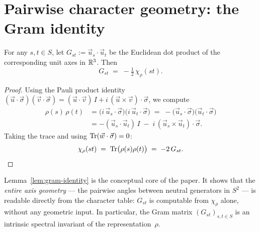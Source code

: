 \section{Pairwise character geometry: the Gram identity}
  \label{sec:gram}

  \begin{lemma}
    \label{lem:gram-identity}
    For any $s, t \in S$, let $G_{st} := \vec{u}_s \cdot \vec{u}_t$ be the Euclidean
    dot product of the corresponding unit axes in $\mathbb{R}^3$.
    Then
    \begin{equation}
      G_{st} \;=\; -\tfrac{1}{2}\,\chi_\rho(st).
      \label{eq:gram-identity}
    \end{equation}
  \end{lemma}

  \begin{proof}
    Using the Pauli product identity
    $({\vec{u}} \cdot \vec{\sigma})({\vec{v}} \cdot \vec{\sigma})
    = (\vec{u} \cdot \vec{v})\,I + i\,(\vec{u} \times \vec{v}) \cdot \vec{\sigma}$,
    we compute
    \begin{align*}
      \rho(s)\,\rho(t)
      &= \bigl(i\,\vec{u}_s \cdot \vec{\sigma}\bigr)
      \bigl(i\,\vec{u}_t \cdot \vec{\sigma}\bigr)
      \;=\; -\bigl(\vec{u}_s \cdot \vec{\sigma}\bigr)
      \bigl(\vec{u}_t \cdot \vec{\sigma}\bigr) \\
      &= -(\vec{u}_s \cdot \vec{u}_t)\,I
      \;-\; i\,(\vec{u}_s \times \vec{u}_t) \cdot \vec{\sigma}.
    \end{align*}
    Taking the trace and using $\mathrm{Tr}(\vec{w} \cdot \vec{\sigma}) = 0$:
    \[
      \chi_\rho(st)
      \;=\; \mathrm{Tr}\bigl(\rho(s)\rho(t)\bigr)
      \;=\; -2\,G_{st}.
      \qedhere
    \]
  \end{proof}

  \begin{remark}
    Lemma~\ref{lem:gram-identity} is the conceptual core of the paper.
    It shows that the \emph{entire axis geometry} --- the pairwise angles between
    neutral generators in $S^2$ --- is readable directly from the character table:
    $G_{st}$ is computable from $\chi_\rho$ alone, without any geometric input.
    In particular, the Gram matrix $(G_{st})_{s,t \in S}$ is an intrinsic spectral
    invariant of the representation~$\rho$.
  \end{remark}
